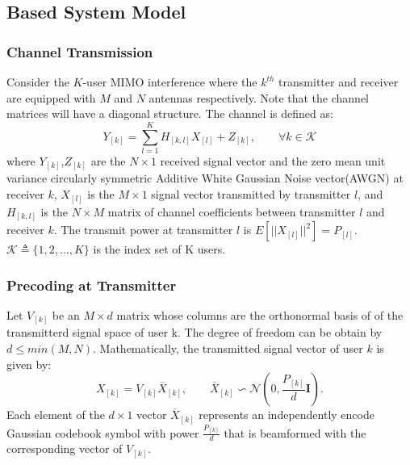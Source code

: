 \documentclass[12pt, onecolumn]{IEEEtran}
\begin{document}
\subsection{Based System Model}
\subsubsection{Channel Transmission}
Consider the $K$-user MIMO interference where the $k^{th}$ transmitter and receiver are equipped with $M$ and $N$ antennas respectively. Note that the channel matrices will have  a diagonal structure. The channel is defined as:
\begin{equation}\label{Channel}
    Y_{[k]} = \sum_{l=1}^{K}H_{[k,l]}X_{[l]} +Z_{[k]}, \qquad  \forall{}k \in \mathcal{K}
\end{equation}
where  $Y_{[k]}$,$Z_{[k]}$ are the $N\times{}1$ received signal vector and the zero mean unit variance circularly symmetric Additive White Gaussian Noise vector(AWGN) at receiver $k$, $X_{[l]}$ is the $M\times{}1$ signal vector transmitted by transmitter $l$, and $H_{[k,l]}$ is the $N\times{}M$ matrix of channel coefficients between transmitter $l$ and receiver $k$. The transmit power at transmitter $l$ is $E[||X_{[l]}||^{2}] = P_{[l]}$. $\mathcal{K} \triangleq \{1,2,...,K\}$ is the index set of K users.


\subsubsection{Precoding at Transmitter}
Let $V_{[k]}$ be an $M\times{}d$ matrix whose columns are the orthonormal basis of of the transmitterd signal space of user k. The degree of freedom can be obtain by $d \leq{} min(M,N)$. Mathematically, the transmitted signal vector of user $k$ is given by:
\begin{equation}\label{Precoding}
    X_{[k]} = V_{[k]}\overline{X}_{[k]}, \qquad \overline{X}_{[k]} \backsim \mathcal{N}(0,\frac{P_{[k]}}{d}\mathbf{I}).
\end{equation}
Each element of the $d\times{}1$ vector $\overline{X}_{[k]}$  represents an independently encode Gaussian codebook symbol with power $\frac{P_{[k]}}{d}$ that is beamformed with the corresponding vector of $V_{[k]}$.
\end{document}
